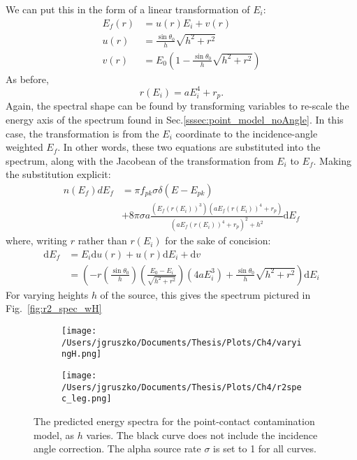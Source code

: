 We can put this in the form of a linear transformation of $E_i$:
\begin{equation}
\begin{split}
E_f(r) &= u(r)E_i+v(r) \\
u(r) &= \frac{\sin\theta_0}{h}\sqrt{h^2+r^2} \\
v(r) &= E_0(1-\frac{\sin\theta_0}{h}\sqrt{h^2+r^2})
\end{split}
\end{equation}
As before, 
$$ r(E_i) = aE_i^4 +r_p. $$
Again, the spectral shape can be found by transforming variables to re-scale the energy axis of the spectrum found in Sec.\ref{sssec:point_model_noAngle}. In this case, the transformation is from the $E_i$ coordinate to the incidence-angle weighted $E_f$. In other words, these two equations are substituted into the spectrum, along with the Jacobean of the transformation from $E_i$ to $E_f$. 
Making the substitution explicit: 
\begin{equation}
\begin{split}
n(E_f)dE_f &= \pi f_{pk}\sigma\delta(E-E_{pk}) \\
&+ 8\pi \sigma a \frac{(E_f(r(E_i))^3)(aE_f(r(E_i))^4+r_p)}{(aE_f(r(E_i))^4+r_p)^2+h^2} \mathrm{d}E_f
\end{split}
\label{eqn:r2_spec}
\end{equation}
where, writing $r$ rather than $r(E_i)$ for the sake of concision:
\begin{equation}
\begin{split}
\mathrm{d}E_f &= E_i\mathrm{d}u(r)+u(r)\mathrm{d}E_i + \mathrm{d}v \\
&= (-r(\frac{\sin\theta_0}{h})(\frac{E_0-E_i}{\sqrt{h^2+r^2}})(4aE_i^3)+\frac{\sin\theta_0}{h}\sqrt{h^2+r^2})\mathrm{d}E_i
\end{split}
\label{eqn:r2_jac}
\end{equation}
For varying heights $h$ of the source, this gives the spectrum pictured in Fig.~\ref{fig:r2_spec_wH}

\begin{figure}[t]
 \centering
 \begin{subfigure}[]{.7\textwidth}
 \texttt{[image: /Users/jgruszko/Documents/Thesis/Plots/Ch4/varyingH.png]}
 \end{subfigure}
  \begin{subfigure}[]{.25\textwidth}
 \texttt{[image: /Users/jgruszko/Documents/Thesis/Plots/Ch4/r2spec\_leg.png]}
 \end{subfigure}
 \caption[The predicted energy spectra for the point-contact contamination model, as $h$ varies]{The predicted energy spectra for the point-contact contamination model, as $h$ varies. The black curve does not include the incidence angle correction. The alpha source rate $\sigma$ is set to 1 for all curves.} 
 \label{fig:spec_shape}
\end{figure}

